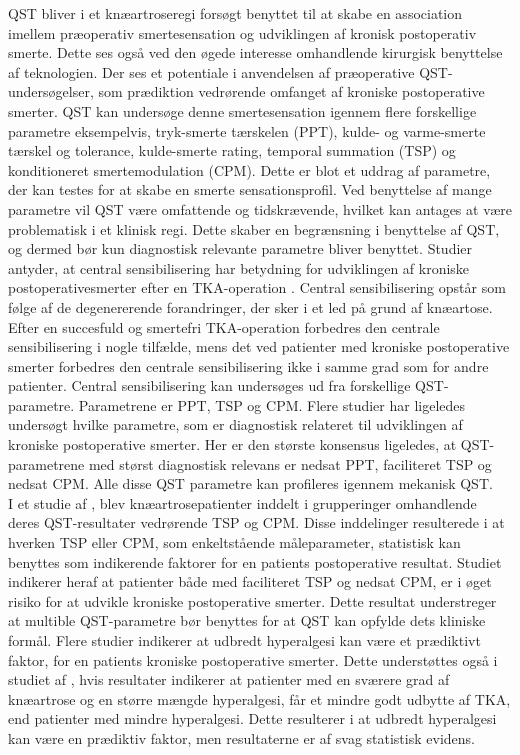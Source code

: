QST bliver i et knæartroseregi forsøgt benyttet til at skabe en association imellem præoperativ smertesensation og udviklingen af kronisk postoperativ smerte. Dette ses også ved den øgede interesse omhandlende kirurgisk benyttelse af teknologien. Der ses et potentiale i anvendelsen af præoperative QST-undersøgelser, som prædiktion vedrørende omfanget af kroniske postoperative smerter. \citep{Wylde2013} QST kan undersøge denne smertesensation igennem flere forskellige parametre eksempelvis, tryk-smerte tærskelen (PPT), kulde- og varme-smerte tærskel og tolerance, kulde-smerte rating, temporal summation (TSP) og konditioneret smertemodulation (CPM). \citep{Cornelius2015} Dette er blot et uddrag af parametre, der kan testes for at skabe en smerte sensationsprofil. Ved benyttelse af mange parametre vil QST være omfattende og tidskrævende, hvilket kan antages at være problematisk i et klinisk regi. Dette skaber en begrænsning i benyttelse af QST, og dermed bør kun diagnostisk relevante parametre bliver benyttet. \citep{Nielsen2009} Studier antyder, at central sensibilisering har betydning for udviklingen af kroniske postoperativesmerter efter en TKA-operation \citep{Suokas2012}. Central sensibilisering opstår som følge af de degenererende forandringer, der sker i et led på grund af knæartose. \citep{Arendt-Nielsen2015}  Efter en succesfuld og smertefri TKA-operation forbedres den centrale sensibilisering i nogle tilfælde, mens det ved patienter med kroniske postoperative smerter forbedres den centrale sensibilisering ikke i samme grad som for andre patienter. \citep{Arendt-Nielsen2015} Central sensibilisering kan undersøges ud fra forskellige QST-parametre. Parametrene er PPT, TSP og CPM. \citep{Arendt-Nielsen2015} Flere studier har ligeledes undersøgt hvilke parametre, som er diagnostisk relateret til udviklingen af kroniske postoperative smerter. Her er den største konsensus ligeledes, at QST-parametrene med størst diagnostisk relevans er nedsat PPT, faciliteret TSP og nedsat CPM. Alle disse QST parametre kan profileres igennem mekanisk QST. \citep{Petersen2015} \citep{Petersen2016} \citep{Wylde2015} \\
I et studie af , blev knæartrosepatienter inddelt i grupperinger omhandlende deres QST-resultater vedrørende TSP og CPM. Disse inddelinger resulterede i at hverken TSP eller CPM, som enkeltstående måleparameter, statistisk kan benyttes som indikerende faktorer for en patients postoperative resultat. Studiet indikerer heraf at patienter både med faciliteret TSP og nedsat CPM, er i øget risiko for at udvikle kroniske postoperative smerter. Dette resultat understreger at multible QST-parametre bør benyttes for at QST kan opfylde dets kliniske formål. \citep{Petersen2016} Flere studier indikerer at udbredt hyperalgesi kan være et prædiktivt faktor, for en patients kroniske postoperative smerter. \citep{Petersen2016} \citep{Wylde2013} Dette understøttes også i studiet af , hvis resultater indikerer at patienter med en sværere grad af knæartrose og en større mængde hyperalgesi, får et mindre godt udbytte af TKA, end patienter med mindre hyperalgesi. Dette resulterer i at udbredt hyperalgesi kan være en prædiktiv faktor, men resultaterne er af svag statistisk evidens. \citep{Wylde2016c}
